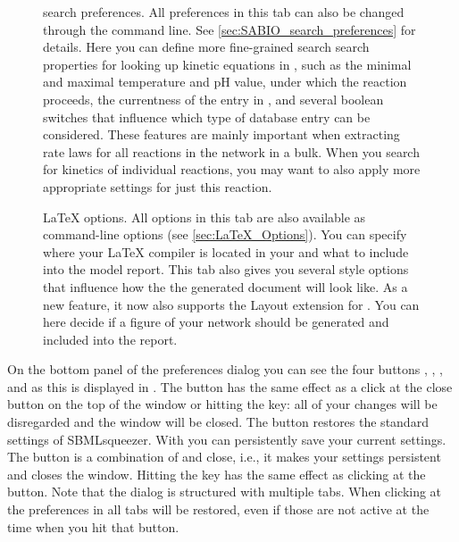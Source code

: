 \begin{figure}
\caption{\SABIO search preferences.
All preferences in this tab can also be changed through the command line.
See \vref{sec:SABIO_search_preferences} for details.
Here you can define more fine-grained search search properties for looking up
kinetic equations in \SABIO, such as the minimal and maximal temperature and
pH value, under which the reaction proceeds, the currentness of the entry in
\SABIO, and several boolean switches that influence which type of database entry
can be considered.
These features are mainly important when extracting rate laws for all reactions
in the network in a bulk.
When you search for kinetics of individual reactions, you may want to also apply
more appropriate settings for just this reaction.}
\label{fig:SABIO-RK_search_preferences}
\end{figure}

\begin{figure}
\caption{\LaTeX{} options.
All options in this tab are also available as command-line options
(see \vref{sec:LaTeX_Options}).
You can specify where your \LaTeX{} compiler is located in your \OS and what
to include into the model report.
This tab also gives you several style options that influence how the
the generated document will look like.
As a new feature, it now also supports the Layout extension for \SBML
\citep{Gauges2006}.
You can here decide if a figure of your network should be generated and
included into the report.}
\label{fig:LaTeX_Options}
\end{figure}
On the bottom panel of the preferences dialog you can see the four buttons
, , , and  as this is displayed in
.
The  button has the same effect as a click at the close button on the
top of the window or hitting the \keys{\escwin} key: all of your changes will be
disregarded and the window will be closed.
The  button restores the standard settings of SBMLsqueezer.
With  you can persistently save your current settings.
The  button is a combination of  and close, i.e., it makes your
settings persistent and closes the window.
Hitting the \keys{\return} key has the same effect as clicking at the  button.
Note that the dialog is structured with multiple tabs. When clicking at
 the preferences in all tabs will be restored, even if those are not
active at the time when you hit that button.


